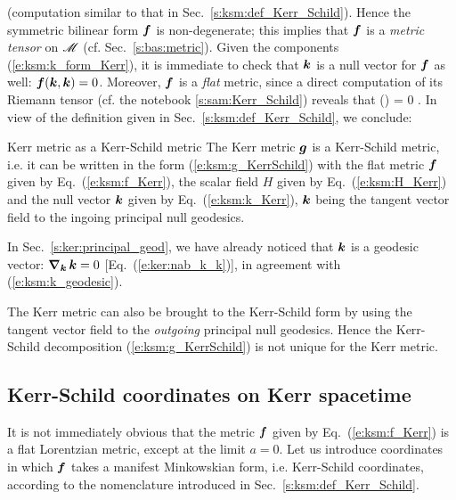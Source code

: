 (computation similar to that in Sec.~\ref{s:ksm:def_Kerr_Schild}). Hence the
symmetric bilinear form $\bm{f}$ is non-degenerate; this implies that $\bm{f}$
is a \emph{metric tensor} on $\mathscr{M}$ (cf. Sec.~\ref{s:bas:metric}).
Given the components (\ref{e:ksm:k_form_Kerr}), it is immediate to check that $\bm{k}$ is a null vector for $\bm{f}$ as well: $\bm{f}(\bm{k}, \bm{k}) = 0$.
Moreover, $\bm{f}$ is a \emph{flat} metric, since a direct computation of its
Riemann tensor (cf. the notebook \ref{s:sam:Kerr_Schild}) reveals that
\be
    () = 0 .
\ee
In view of the definition given in Sec.~\ref{s:ksm:def_Kerr_Schild},
we conclude:
\begin{tprop}{Kerr metric as a Kerr-Schild metric}{}
The Kerr metric $\bm{g}$ is a Kerr-Schild metric, i.e. it can be written in
the form (\ref{e:ksm:g_KerrSchild}) with the flat metric
$\bm{f}$ given by Eq.~(\ref{e:ksm:f_Kerr}), the scalar field $H$ given
by Eq.~(\ref{e:ksm:H_Kerr}) and the null vector $\bm{k}$ given by
Eq.~(\ref{e:ksm:k_Kerr}), $\bm{k}$ being the tangent vector field to
the ingoing principal null geodesics.
\end{tprop}
In Sec.~\ref{s:ker:principal_geod},
we have already noticed that $\bm{k}$ is a geodesic vector:
$\bm{\nabla}_{\bm{k}}\, \bm{k} = 0$ [Eq.~(\ref{e:ker:nab_k_k})], in agreement with
(\ref{e:ksm:k_geodesic}).

\begin{remark}
The Kerr metric can also be brought to the Kerr-Schild form by using the
tangent vector field to the  \emph{outgoing} principal null geodesics. Hence
the Kerr-Schild decomposition (\ref{e:ksm:g_KerrSchild}) is not unique for
the Kerr metric.
\end{remark}

\subsection{Kerr-Schild coordinates on Kerr spacetime}

It is not immediately obvious that the metric $\bm{f}$ given by
Eq.~(\ref{e:ksm:f_Kerr}) is a flat Lorentzian metric, except at the limit $a=0$.
Let us introduce coordinates in which $\bm{f}$ takes a manifest Minkowskian
form, i.e. Kerr-Schild coordinates, according to the nomenclature introduced
in Sec.~\ref{s:ksm:def_Kerr_Schild}.

